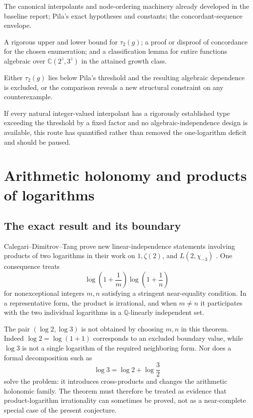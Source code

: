 \documentclass[10pt,letterpaper]{article}
\newcommand{\Q}{\mathbb Q}
\newcommand{\C}{\mathbb C}
\begin{document}
\begin{description}[style=nextline]
\item[Input.]
The canonical interpolants and node-ordering machinery already developed in the baseline
report; Pila's exact hypotheses and constants; the concordant-sequence envelope.

\item[Deliverables.]
A rigorous upper and lower bound for \(\tau_2(g)\); a proof or disproof of concordance for the
chosen enumeration; and a classification lemma for entire functions algebraic over
\(\C(2^z,3^z)\) in the attained growth class.

\item[Success condition.]
Either \(\tau_2(g)\) lies below Pila's threshold and the resulting algebraic dependence is
excluded, or the comparison reveals a new structural constraint on any counterexample.

\item[Stop condition.]
If every natural integer-valued interpolant has a rigorously established type exceeding the
threshold by a fixed factor and no algebraic-independence design is available, this route has
quantified rather than removed the one-logarithm deficit and should be paused.
\end{description}

\section{Arithmetic holonomy and products of logarithms}
\label{sec:cdt}

\subsection{The exact result and its boundary}

Calegari--Dimitrov--Tang prove new linear-independence statements involving products of two
logarithms in their work on \(1,\zeta(2)\), and \(L(2,\chi_{-3})\)
\cite{CDTProducts}.  One consequence treats
\[
  \log\left(1+\frac1m\right)
  \log\left(1+\frac1n\right)
\]
for nonexceptional integers \(m,n\) satisfying a stringent near-equality condition.  In a
representative form, the product is irrational, and when \(m\neq n\) it participates with
the two individual logarithms in a \(\Q\)-linearly independent set.

The pair \((\log2,\log3)\) is not obtained by choosing \(m,n\) in this theorem.  Indeed
\(\log2=\log(1+1)\) corresponds to an excluded boundary value, while \(\log3\) is not a
single logarithm of the required neighboring form.  Nor does a formal decomposition such as
\[
  \log3=\log2+\log\frac32
\]
solve the problem: it introduces cross-products and changes the arithmetic holonomic family.
The theorem must therefore be treated as evidence that product-logarithm irrationality can
sometimes be proved, not as a near-complete special case of the present conjecture.
\end{document}
